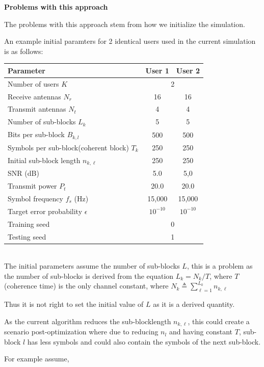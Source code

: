\documentclass[a4paper, 12pt, onecolumn, journal, twoside, draftclsnofoot]{IEEEtran}
\begin{document}
\newpage
\textbf{Problems with this approach}

The problems with this approach stem from how we initialize the simulation.

An example initial paramters for 2 identical users used in the current simulation is as follows:

\begin{tabular}{|l|c|c|}
\hline
\textbf{Parameter} & \textbf{User 1} & \textbf{User 2} \\
\hline
Number of users $K$ & \multicolumn{2}{c|}{2} \\
\hline
Receive antennas $N_r$ & 16 & 16 \\
Transmit antennas $N_t$ & 4 & 4 \\
\hline
Number of sub-blocks $L_k$ & 5 & 5 \\
Bits per sub-block $B_{k,l}$ & 500 & 500 \\
\hline
Symbols per sub-block(coherent block) $T_{k}$ & 250 & 250 \\
Initial sub-block length $n_{k,\ell}$ & 250 & 250 \\
\hline
SNR (dB) & 5.0 & 5,0 \\
Transmit power $P_t$ & 20.0 & 20.0 \\
\hline
Symbol frequency $f_s$ (Hz) & 15{,}000 & 15{,}000 \\
Target error probability $\epsilon$ & $10^{-10}$ & $10^{-10}$ \\
\hline
Training seed & \multicolumn{2}{c|}{0} \\
Testing seed & \multicolumn{2}{c|}{1} \\
\hline 
\end{tabular} \\


The initial parameters assume the number of sub-blocks $L$, this is a problem as the number of sub-blocks is derived from the equation $L_k = N_k/T$, where $T$ (coherence time) is the only channel constant, where $\displaystyle N_k \triangleq \sum_{\ell = 1}^{L_k} n_{k,\ell}$

Thus it is not right to set the initial value of $L$ as it is a derived quantity.

As the current algorithm reduces the sub-blocklength $n_{k,\ell}$,  this could create a scenario post-optimization where due to reducing $n_l$ and having constant $T$, sub-block $l$ has less symbols and could also contain the symbols of the next sub-block.

For example assume,
\end{document}
